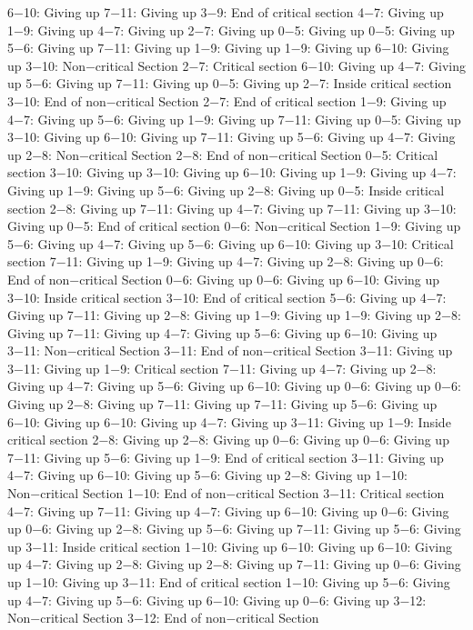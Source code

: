 6−10: Giving up
7−11: Giving up
3−9: End of critical section
4−7: Giving up
1−9: Giving up
4−7: Giving up
2−7: Giving up
0−5: Giving up
0−5: Giving up
5−6: Giving up
7−11: Giving up
1−9: Giving up
1−9: Giving up
6−10: Giving up
3−10: Non−critical Section
2−7: Critical section
6−10: Giving up
4−7: Giving up
5−6: Giving up
7−11: Giving up
0−5: Giving up
2−7: Inside critical section
3−10: End of non−critical Section
2−7: End of critical section
1−9: Giving up
4−7: Giving up
5−6: Giving up
1−9: Giving up
7−11: Giving up
0−5: Giving up
3−10: Giving up
6−10: Giving up
7−11: Giving up
5−6: Giving up
4−7: Giving up
2−8: Non−critical Section
2−8: End of non−critical Section
0−5: Critical section
3−10: Giving up
3−10: Giving up
6−10: Giving up
1−9: Giving up
4−7: Giving up
1−9: Giving up
5−6: Giving up
2−8: Giving up
0−5: Inside critical section
2−8: Giving up
7−11: Giving up
4−7: Giving up
7−11: Giving up
3−10: Giving up
0−5: End of critical section
0−6: Non−critical Section
1−9: Giving up
5−6: Giving up
4−7: Giving up
5−6: Giving up
6−10: Giving up
3−10: Critical section
7−11: Giving up
1−9: Giving up
4−7: Giving up
2−8: Giving up
0−6: End of non−critical Section
0−6: Giving up
0−6: Giving up
6−10: Giving up
3−10: Inside critical section
3−10: End of critical section
5−6: Giving up
4−7: Giving up
7−11: Giving up
2−8: Giving up
1−9: Giving up
1−9: Giving up
2−8: Giving up
7−11: Giving up
4−7: Giving up
5−6: Giving up
6−10: Giving up
3−11: Non−critical Section
3−11: End of non−critical Section
3−11: Giving up
3−11: Giving up
1−9: Critical section
7−11: Giving up
4−7: Giving up
2−8: Giving up
4−7: Giving up
5−6: Giving up
6−10: Giving up
0−6: Giving up
0−6: Giving up
2−8: Giving up
7−11: Giving up
7−11: Giving up
5−6: Giving up
6−10: Giving up
6−10: Giving up
4−7: Giving up
3−11: Giving up
1−9: Inside critical section
2−8: Giving up
2−8: Giving up
0−6: Giving up
0−6: Giving up
7−11: Giving up
5−6: Giving up
1−9: End of critical section
3−11: Giving up
4−7: Giving up
6−10: Giving up
5−6: Giving up
2−8: Giving up
1−10: Non−critical Section
1−10: End of non−critical Section
3−11: Critical section
4−7: Giving up
7−11: Giving up
4−7: Giving up
6−10: Giving up
0−6: Giving up
0−6: Giving up
2−8: Giving up
5−6: Giving up
7−11: Giving up
5−6: Giving up
3−11: Inside critical section
1−10: Giving up
6−10: Giving up
6−10: Giving up
4−7: Giving up
2−8: Giving up
2−8: Giving up
7−11: Giving up
0−6: Giving up
1−10: Giving up
3−11: End of critical section
1−10: Giving up
5−6: Giving up
4−7: Giving up
5−6: Giving up
6−10: Giving up
0−6: Giving up
3−12: Non−critical Section
3−12: End of non−critical Section

